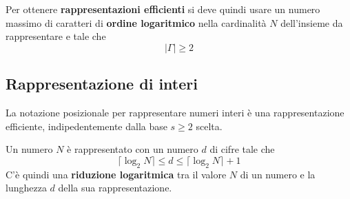 Per ottenere \textbf{rappresentazioni efficienti} si deve quindi usare un numero massimo di caratteri di
\textbf{ordine logaritmico} nella cardinalit\`a $N$ dell'insieme da rappresentare e tale che
\[ | \Gamma | \geq 2 \]

\subsection{Rappresentazione di interi}
La notazione posizionale per rappresentare numeri interi \`e una rappresentazione efficiente, indipedentemente dalla
base $s \geq 2$ scelta.

Un numero $N$ \`e rappresentato con un numero $d$ di cifre tale che
\[ \lceil \log_2 N \rceil \leq d \leq \lceil \log_2 N \rceil + 1 \]
C'\`e quindi una \textbf{riduzione logaritmica} tra il valore $N$ di un numero e la lunghezza $d$ della sua
rappresentazione.